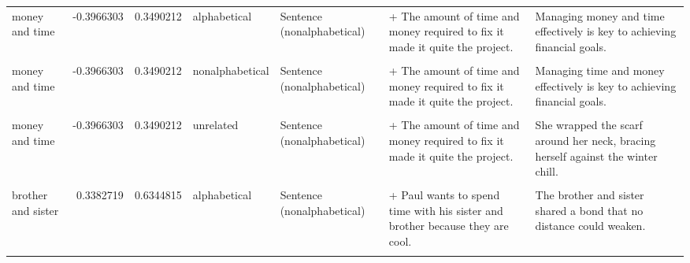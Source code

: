 \documentclass[
  12pt,
]{scrartcl}
\begin{document}
\begin{landscape}
\begin{longtable}{lrrllll}
money and time & -0.3966303 & 0.3490212 & alphabetical & Sentence (nonalphabetical) & + The amount of time and money required to fix it made it quite the project. & Managing money and time effectively is key to achieving financial goals.\\
\cellcolor{gray!6}{money and time} & \cellcolor{gray!6}{-0.3966303} & \cellcolor{gray!6}{0.3490212} & \cellcolor{gray!6}{nonalphabetical} & \cellcolor{gray!6}{Sentence (alphabetical)} & \cellcolor{gray!6}{+ The amount of money and time required to fix it made it quite the project.} & \cellcolor{gray!6}{Managing time and money effectively is key to achieving financial goals.}\\
money and time & -0.3966303 & 0.3490212 & nonalphabetical & Sentence (nonalphabetical) & + The amount of time and money required to fix it made it quite the project. & Managing time and money effectively is key to achieving financial goals.\\
\cellcolor{gray!6}{money and time} & \cellcolor{gray!6}{-0.3966303} & \cellcolor{gray!6}{0.3490212} & \cellcolor{gray!6}{unrelated} & \cellcolor{gray!6}{Sentence (alphabetical)} & \cellcolor{gray!6}{+ The amount of money and time required to fix it made it quite the project.} & \cellcolor{gray!6}{She wrapped the scarf around her neck, bracing herself against the winter chill.}\\
\addlinespace
money and time & -0.3966303 & 0.3490212 & unrelated & Sentence (nonalphabetical) & + The amount of time and money required to fix it made it quite the project. & She wrapped the scarf around her neck, bracing herself against the winter chill.\\
\cellcolor{gray!6}{brother and sister} & \cellcolor{gray!6}{0.3382719} & \cellcolor{gray!6}{0.6344815} & \cellcolor{gray!6}{alphabetical} & \cellcolor{gray!6}{Sentence (alphabetical)} & \cellcolor{gray!6}{+ Paul wants to spend time with his brother and sister because they are cool.} & \cellcolor{gray!6}{The brother and sister shared a bond that no distance could weaken.}\\
brother and sister & 0.3382719 & 0.6344815 & alphabetical & Sentence (nonalphabetical) & + Paul wants to spend time with his sister and brother because they are cool. & The brother and sister shared a bond that no distance could weaken.\\
\cellcolor{gray!6}{brother and sister} & \cellcolor{gray!6}{0.3382719} & \cellcolor{gray!6}{0.6344815} & \cellcolor{gray!6}{nonalphabetical} & \cellcolor{gray!6}{Sentence (alphabetical)} & \cellcolor{gray!6}{+ Paul wants to spend time with his brother and sister because they are cool.} & \cellcolor{gray!6}{The sister and brother shared a bond that no distance could weaken.}\\

\end{longtable}
\end{landscape}
\end{document}

